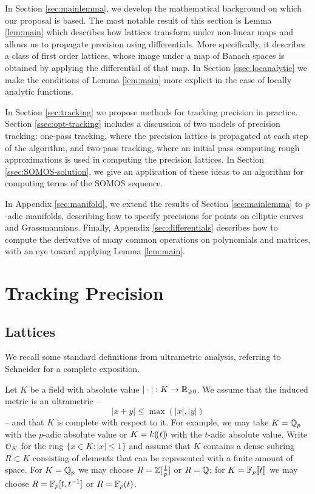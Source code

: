 \documentclass{lms}
\begin{document}
In Section \ref{sec:mainlemma}, we develop the mathematical background on which our proposal is based.
The most notable result of this section is Lemma \ref{lem:main} which describes how lattices transform under non-linear maps and allows us to propagate
precision using differentials.  More specifically, it describes a class of first order lattices,
whose image under a map of Banach spaces is obtained by applying the
differential of that map.  In Section \ref{ssec:locanalytic} we make the conditions
of Lemma \ref{lem:main} more explicit in the case of locally analytic functions.

In Section \ref{sec:tracking} we propose methods for tracking precision in practice.
Section \ref{ssec:opt-tracking} includes a discussion of two models of precision tracking:
one-pass tracking, where the precision lattice is propagated at each step of the algorithm,
and two-pass tracking, where an initial pass computing rough approximations is used
in computing the precision lattices.  In Section \ref{ssec:SOMOS-solution}, we give
an application of these ideas to an algorithm for computing terms of the SOMOS sequence.

In Appendix \ref{sec:manifold}, we extend the results of Section \ref{sec:mainlemma}
to $p$-adic manifolds, describing how to specify precisions for points on elliptic curves
and Grassmannians.  Finally, Appendix \ref{sec:differentials} describes how to compute
the derivative of many common operations on polynomials and matrices, with an eye
toward applying Lemma \ref{lem:main}.

\section{Tracking Precision} \label{sec:prec-proposal}

\subsection{Lattices}

We recall some standard definitions from ultrametric analysis, referring to
Schneider \cite{schneider:11a} for a complete exposition.

Let $K$ be a field with absolute value $|\cdot| : K \to \mathbb R_{\geqslant 0}$.
We assume that the induced metric is an ultrametric -- 
\[ \lvert x + y \rvert \leq \max(\lvert x \rvert, \lvert y \rvert) \]
-- and that $K$ is complete with respect to it.
For example, we may take $K = \mathbb Q_p$ with the
$p$-adic absolute value or $K = k(\!( t )\!)$ with the $t$-adic absolute value.
Write $\OK$ for the ring $\{x \in K : \lvert x \rvert \le 1\}$ and assume
that $K$ contains a dense subring $R \subset K$
consisting of elements that can be represented with a finite amount of space.
For $K = \mathbb Q_p$ we may choose $R = \mathbb Z[\frac1p]$ or $R = \mathbb Q$;
for $K = \mathbb{F}_p\llbracket t \rrbracket$ we may choose $R = \mathbb{F}_p[t, t^{-1}]$ or $R = \mathbb{F}_p(t)$.
\end{document}
